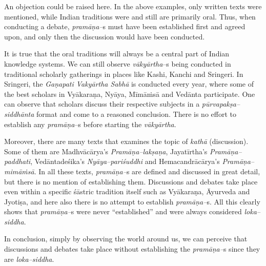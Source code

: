 An objection could be raised here. In the above examples, only written texts were mentioned, while Indian traditions were and still are primarily oral. Thus, when conducting a debate, \textit{pramāṇa–}s must have been established first and agreed upon, and only then the discussion would have been conducted.

It is true that the oral traditions will always be a central part of Indian knowledge systems. We can still observe \textit{vākyārtha}–s being conducted in traditional scholarly gatherings in places like Kashi, Kanchi and Sringeri. In Sringeri, the \textit{Gaṇapati Vakyārtha Sabhā} is conducted every year, where some of the best scholars in Vyākaraṇa, Nyāya, Mīmāṁsā and Vedānta participate. One can observe that scholars discuss their respective subjects in a \textit{pūrvapakṣa–siddhānta} format and come to a reasoned conclusion. There is no effort to establish any \textit{pramāṇa}–s before starting the \textit{vākyārtha}.

Moreover, there are many texts that examines the topic of \textit{kathā} (discussion). Some of them are Madhvācārya’s \textit{Pramāṇa–lakṣaṇa}, Jayatīrtha’s \textit{Pramāṇa–paddhati}, Vedāntadeśika’s \textit{Nyāya–pariśuddhi} and Hemacandrācārya’s \textit{Pramāṇa–mimāṁsā}. In all these texts, \textit{pramāṇa–}s are defined and discussed in great detail, but there is no mention of establishing them. Discussions and debates take place even within a specific śāstric tradition itself such as Vyākaraṇa, Āyurveda and Jyotiṣa, and here also there is no attempt to establish \textit{pramāṇa–}s. All this clearly shows that \textit{pramāṇa–}s were never “established” and were always considered \textit{loka–siddha}.

In conclusion, simply by observing the world around us, we can perceive that discussions and debates take place without establishing the \textit{pramāṇa–}s since they are \textit{loka–siddha}.

